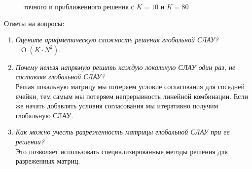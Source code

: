 \documentclass{article}
\begin{document}
\begin{figure}[H]
  \centering
  \hfill
  \caption{ точного и приближенного решения с $K = 10$ и $K = 80$}
\end{figure}

Ответы на вопросы:
\begin{enumerate}
    \item \textit{Оцените арифметическую сложность решения глобальной СЛАУ?} \\
    ~$\operatorname{O}(K \cdot N^2)$.
    \item \textit{Почему нельзя напрямую решить каждую локальную СЛАУ один раз, не составляя глобальной СЛАУ?} \\
    Решая локальную матрицу мы потеряем условие согласования для соседней ячейки, тем самым мы потеряем непрерывность линейной комбинации. Если же начать добавлять условия согласования мы итеративно получим глобальную СЛАУ.
    \item \textit{Как можно учесть разреженность матрицы глобальной СЛАУ при ее решении?} \\
    Это позволяет использовать специализированные методы решения для разреженных матриц.
\end{enumerate}
\end{document}
